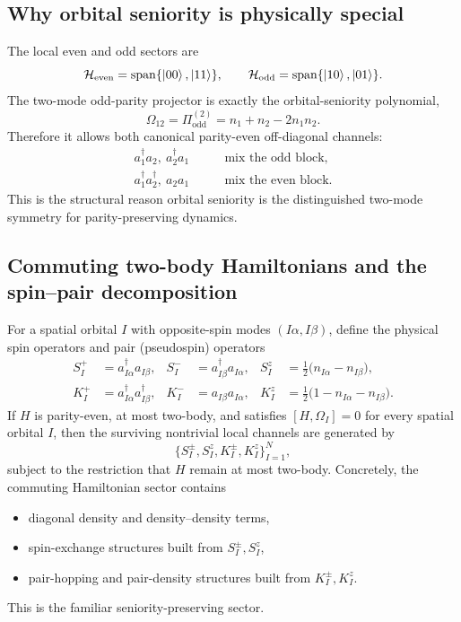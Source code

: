 \documentclass[11pt]{article}
\newcommand{\odd}{\mathrm{odd}}
\newcommand{\even}{\mathrm{even}}
\newcommand{\spanC}{\mathrm{span}}
\theoremstyle{definition}
\theoremstyle{remark}
\begin{document}
\subsection{Why orbital seniority is physically special}
The local even and odd sectors are
\begin{equation}
  \mathcal H_{\even}=\spanC\{\ket{00},\ket{11}\},
  \qquad
  \mathcal H_{\odd}=\spanC\{\ket{10},\ket{01}\}.
\end{equation}
The two-mode odd-parity projector is exactly the orbital-seniority polynomial,
\begin{equation}
  \Omega_{12}=\Pi^{(2)}_{\odd}=n_1+n_2-2n_1n_2.
\end{equation}
Therefore it allows both canonical parity-even off-diagonal channels:
\begin{align}
  a_1^\dagger a_2,\ a_2^\dagger a_1
  &\qquad \text{mix the odd block},
  \\
  a_1^\dagger a_2^\dagger,\ a_2a_1
  &\qquad \text{mix the even block}.
\end{align}
This is the structural reason orbital seniority is the distinguished two-mode symmetry for parity-preserving dynamics.

\subsection{Commuting two-body Hamiltonians and the spin--pair decomposition}
For a spatial orbital $I$ with opposite-spin modes $(I\alpha,I\beta)$, define the physical spin operators and pair (pseudospin) operators
\begin{align}
  S_I^+ &= a_{I\alpha}^\dagger a_{I\beta},
  &
  S_I^- &= a_{I\beta}^\dagger a_{I\alpha},
  &
  S_I^z &= \tfrac12\bigl(n_{I\alpha}-n_{I\beta}\bigr),
  \\
  K_I^+ &= a_{I\alpha}^\dagger a_{I\beta}^\dagger,
  &
  K_I^- &= a_{I\beta}a_{I\alpha},
  &
  K_I^z &= \tfrac12\bigl(1-n_{I\alpha}-n_{I\beta}\bigr).
\end{align}
If $H$ is parity-even, at most two-body, and satisfies $[H,\Omega_I]=0$ for every spatial orbital $I$, then the surviving nontrivial local channels are generated by
\begin{equation}
  \{S_I^\pm,S_I^z,K_I^\pm,K_I^z\}_{I=1}^N,
\end{equation}
subject to the restriction that $H$ remain at most two-body. Concretely, the commuting Hamiltonian sector contains
\begin{itemize}[leftmargin=2em]
  \item diagonal density and density--density terms,
  \item spin-exchange structures built from $S_I^\pm,S_I^z$,
  \item pair-hopping and pair-density structures built from $K_I^\pm,K_I^z$.
\end{itemize}
This is the familiar seniority-preserving sector.
\end{document}
